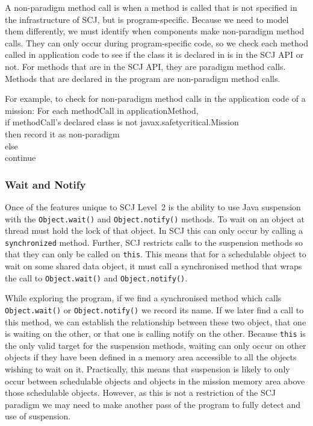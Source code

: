 \documentclass[10pt,a4paper]{article}
\newenvironment{ttSection}{\ttfamily}{\par}
\begin{document}
A non-paradigm method call is when a method is called that is not specified in the infrastructure of SCJ, but is program-specific. Because we need to model them differently, we must identify when components make non-paradigm method calls. They can only occur during program-specific code, so we check each method called in application code to see if the class it is declared in is in the SCJ API or not. For methods that are in the SCJ API, they are paradigm method calls. Methods that are declared in the program are non-paradigm method calls. 

For example, to check for non-paradigm method calls in the application code of a mission:
\begin{ttSection}
For each methodCall in applicationMethod, \\
if methodCall's declared class is not javax.safetycritical.Mission \\
then record it as non-paradigm\\
else\\
continue
\end{ttSection}

\subsubsection{Wait and Notify}

Once of the features unique to SCJ Level~2 is the ability to use Java suspension with the \texttt{Object.wait()} and \texttt{Object.notify()} methods. To wait on an object at thread must hold the lock of that object. In SCJ this can only occur by calling a \texttt{synchronized} method. Further, SCJ restricts calls to the suspension methods so that they can only be called on \texttt{this}. This means that for a schedulable object to wait on some shared data object, it must call a synchronised method that wraps the call to \texttt{Object.wait()} and \texttt{Object.notify()}. 

While exploring the program, if we find a synchronised method which calls \texttt{Object.wait()} or \texttt{Object.notify()} we record its name. If we later find a call to this method, we can establish the relationship between these two object, that one is waiting on the other, or that one is calling notify on the other. Because \texttt{this} is the only valid target for the suspension methods, waiting can only occur on other objects if they have been defined in a memory area accessible to all the objects wishing to wait on it. Practically, this means that suspension is likely to only occur between schedulable objects and objects in the mission memory area above those schedulable objects. However, as this is not a restriction of the SCJ paradigm we may need to make another pass of the program to fully detect and use of suspension.
\end{document}
